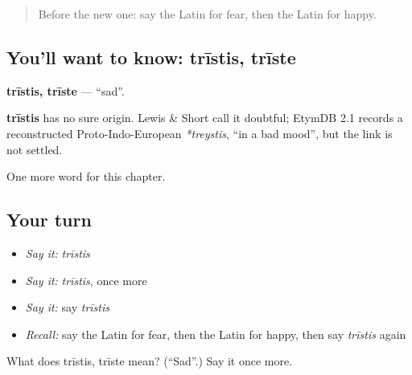 \begin{quote}
Before the new one: say the Latin for fear, then the Latin for happy.
\end{quote}

\subsection*{You'll want to know: trīstis, trīste}
\textbf{trīstis, trīste} — \textquotedblleft{}sad\textquotedblright{}.

\begin{cousinweb}
\textbf{trīstis} has no sure origin. Lewis \& Short call it doubtful; EtymDB 2.1 records a reconstructed Proto-Indo-European \emph{*treystis}, \textquotedblleft{}in a bad mood\textquotedblright{}, but the link is not settled.
\end{cousinweb}

\begin{grammarlens}[title={What you've built}]
One more word for this chapter.
\end{grammarlens}

\subsection*{Your turn}
\begin{itemize}
\raggedright
  \item \emph{Say it:} \emph{trīstis}
  \item \emph{Say it:} \emph{trīstis}, once more
  \item \emph{Say it:} say \emph{trīstis}
  \item \emph{Recall:} say the Latin for fear, then the Latin for happy, then say \emph{trīstis} again
\end{itemize}

\begin{tcolorbox}[breakable,colback=teal!4,colframe=teal!35!black,title={Before you move on}]
What does trīstis, trīste mean? (\textquotedblleft{}Sad\textquotedblright{}.) Say it once more.
\end{tcolorbox}
